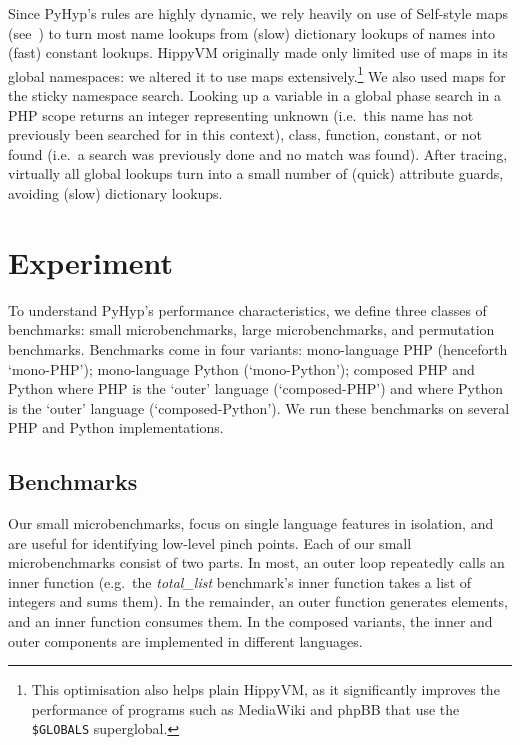 \documentclass[a4paper,UKenglish]{lipics-v2016}
\newcommand{\ourvm}{PyHyp\xspace}
\newcommand{\hippy}{HippyVM\xspace}
\begin{document}
Since \ourvm's rules are highly dynamic, we rely heavily on use of Self-style
maps (see~\cite{chambers89efficient}) to turn most name lookups from (slow)
dictionary lookups of names into (fast) constant lookups.
\hippy originally made only limited use of maps in its global
namespaces: we altered it to use maps extensively.\footnote{This optimisation
also helps plain \hippy, as it significantly improves the performance of
programs such as MediaWiki and phpBB that use the \texttt{\$GLOBALS} superglobal.}
We also used maps for the sticky name\-space search. Looking up a
variable in a global phase search in a PHP scope returns an integer representing
unknown (i.e.~this name has not previously been searched for in this context), class, function,
constant, or not found (i.e.~a search was previously done and no match was
found). After tracing, virtually all global lookups turn
into a small number of (quick) attribute guards, avoiding (slow)
dictionary lookups.


\section{Experiment}
\label{sec:method}

To understand \ourvm's performance characteristics, we define three classes
of benchmarks: small microbenchmarks, large microbenchmarks, and permutation benchmarks.
Benchmarks come in four variants: mono-language PHP (henceforth `mono-PHP');
mono-language Python (`mono-Python'); composed PHP and Python where PHP is the
`outer' language (`composed-PHP') and where Python is the
`outer' language (`composed-Python'). We run these benchmarks
on several PHP and Python implementations.


\subsection{Benchmarks}

\label{microbenchmarks}

Our small microbenchmarks, focus on single language features in isolation, and are
useful for identifying low-level pinch points. Each of our small microbenchmarks
consist of two parts. In most, an outer loop repeatedly
calls an inner function (e.g.~the \emph{total\_list} benchmark's inner
function takes a list of integers and sums them). In the remainder,
an outer function generates elements, and an inner function
consumes them. In the composed variants, the inner
and outer components are implemented in different languages.
\end{document}
